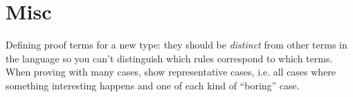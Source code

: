 \section{Misc} Defining proof terms for a new type: they should be
\textit{distinct} from other terms in the language so you can't
distinguish which rules correspond to which terms.
\\ When proving with many cases, show representative cases, i.e. all
cases where something interesting happens and one of each kind of
``boring'' case.
\color{Plum}
  